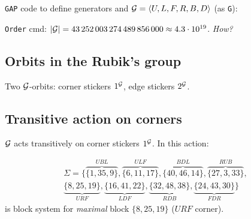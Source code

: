 
\begin{slide}
    \texttt{GAP} code to define generators and $\mathcal{G} = \langle U,L,F,R,B,D \rangle$ (as \texttt{G}):

    {\footnotesize} \pause

    \texttt{Order} cmd: $|\mathcal{G}| = 43\,252\,003\,274\,489\,856\,000 \approx 4.3 \cdot 10^{19}$. \textit{How?}
\end{slide}

\subsection{Orbits in the Rubik's group}

\begin{slide}
    \begin{center}
    \end{center}

    \scriptsize

    \normalsize Two $\mathcal{G}$-orbits: corner stickers $1^{\mathcal{G}}$, edge stickers $2^{\mathcal{G}}$.
\end{slide}

\subsection{Transitive action on corners}

\begin{slide}
    $\mathcal{G}$ acts transitively on corner stickers $1^{\mathcal{G}}$. In this action:

    \begin{center}
    \end{center} \pause

    \vspace{-1cm}
    \begin{multline*}
        \Sigma = \{\overbrace{\{1,35,9\}}^{UBL},\overbrace{\{6,11,17\}}^{ULF},\overbrace{\{40,46,14\}}^{BDL},\overbrace{\{27,3,33\}}^{RUB},\\
        \underbrace{\{8,25,19\}}_{URF},\underbrace{\{16,41,22\}}_{LDF},\underbrace{\{32,48,38\}}_{RDB},\underbrace{\{24,43,30\}}_{FDR}\}
    \end{multline*}
    is block system for \textit{maximal} block $\{8,25,19\}$ ($URF$ corner).
\end{slide}

